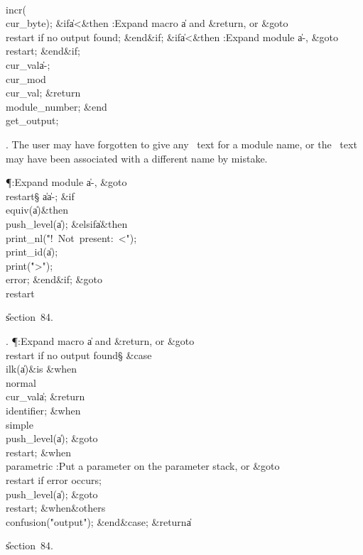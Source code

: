 \\{incr}\?\1(\?\\{cur\_byte}\?\2)\?;\6
\&{if}\1\1\8\|a\?<\?\2\8\&{then}\6
:Expand macro \|a and \&{return}, or \&{goto}\8\\{restart} if no output
found\X;\2\6
\&{end}\8\2\&{if}\1;\6
\&{if}\1\1\8\|a\?<\?\2\8\&{then}\6
:Expand module \|a\?-\?, \&{goto}\8\\{restart}\X;\2\6
\&{end}\8\2\&{if}\1;\6
\\{cur\_val}\?\K\?\|a\?-\?;\5
\\{cur\_mod}\?\K\?\\{cur\_val};\5
\?\&{return}\?\8\\{module\_number};\2\6
\&{end}\8\\{get\_output};\par
\fi

. The user may have forgotten to give any \ADA\ text for a module name,
or the \ADA\ text may have been associated with a different name by mistake.

\Y\P\?\4:Expand module \|a\?-\?, \&{goto}\8\\{restart}\X\S\?\6
\|a\?\K\?\|a\?-\?;\6
\&{if}\1\1\8\\{equiv}\?\1(\?\|a\?\2)\I{}\2\8\&{then}\6
\\{push\_level}\?\1(\?\|a\?\2)\?;\6
\4\&{elsif}\1\8\|a\?\I{}\2\8\&{then}\6
\\{print\_nl}\?\1(\?\.{"!\ Not\ present:\ <"}\?\2)\?;\5
\\{print\_id}\?\1(\?\|a\?\2)\?;\5
\\{print}\?\1(\?\.{">"}\?\2)\?;\5
\\{error};\2\6
\&{end}\8\2\&{if}\1;\6
\&{goto}\8\\{restart}\par
\U section~84.\fi

. \P\?:Expand macro \|a and \&{return}, or \&{goto}\8\\{restart} if no
output found\X\S\?\6
\&{case}\1\8\\{ilk}\?\1(\?\|a\?\2)\?\1\8\&{is}\8\6
\4\&{when}\8\\{normal}\KR\6
\\{cur\_val}\?\K\?\|a;\5
\?\&{return}\?\8\\{identifier};\6
\4\&{when}\8\\{simple}\KR\6
\\{push\_level}\?\1(\?\|a\?\2)\?;\5
\&{goto}\8\\{restart};\6
\4\&{when}\8\\{parametric}\KR\6
:Put a parameter on the parameter stack, or \&{goto}\8\\{restart} if error
occurs\X;\6
\\{push\_level}\?\1(\?\|a\?\2)\?;\5
\&{goto}\8\\{restart};\6
\4\&{when}\8\&{others}\8\KR\6
\\{confusion}\?\1(\?\.{"output"}\?\2)\?;\2\6
\4\2\&{end}\8\&{case};\6
\?\&{return}\?\8\|a\par
\U section~84.\fi

